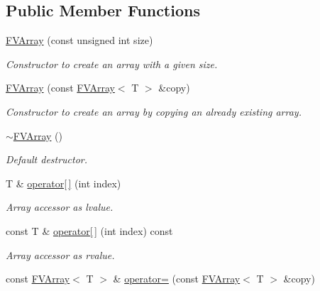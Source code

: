 \subsection*{Public Member Functions}
\begin{DoxyCompactItemize}
\item 
\hyperlink{classFVL_1_1FVArray_aa561520ffeba251ff13b97e6507e9356}{FVArray} (const unsigned int size)
\begin{DoxyCompactList}\small\item\em Constructor to create an array with a given size. \item\end{DoxyCompactList}\item 
\hyperlink{classFVL_1_1FVArray_a47404d96b43a8511ebbc2ddd4fbd8752}{FVArray} (const \hyperlink{classFVL_1_1FVArray}{FVArray}$<$ T $>$ \&copy)
\begin{DoxyCompactList}\small\item\em Constructor to create an array by copying an already existing array. \item\end{DoxyCompactList}\item 
\hyperlink{classFVL_1_1FVArray_a0158998b288980980fbd934dd00ba55b}{$\sim$FVArray} ()
\begin{DoxyCompactList}\small\item\em Default destructor. \item\end{DoxyCompactList}\item 
T \& \hyperlink{classFVL_1_1FVArray_a2d4b36a43041d6505f82836a6aeccd52}{operator\mbox{[}$\,$\mbox{]}} (int index)
\begin{DoxyCompactList}\small\item\em Array accessor as lvalue. \item\end{DoxyCompactList}\item 
const T \& \hyperlink{classFVL_1_1FVArray_a56e773dcafc33b12d2b27d2c7a174f3a}{operator\mbox{[}$\,$\mbox{]}} (int index) const 
\begin{DoxyCompactList}\small\item\em Array accessor as rvalue. \item\end{DoxyCompactList}\item 
const \hyperlink{classFVL_1_1FVArray}{FVArray}$<$ T $>$ \& \hyperlink{classFVL_1_1FVArray_a800962abf6eb71a43d99c156793fd5c5}{operator=} (const \hyperlink{classFVL_1_1FVArray}{FVArray}$<$ T $>$ \&copy)

\end{DoxyCompactItemize}
